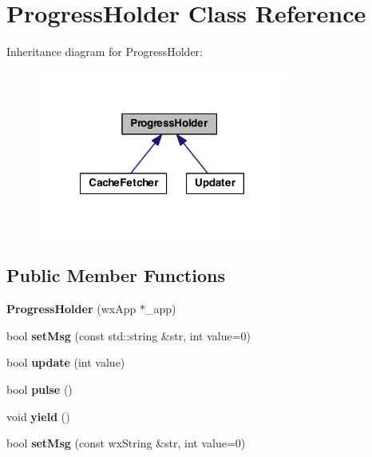 \hypertarget{class_progress_holder}{\section{Progress\-Holder Class Reference}
\label{class_progress_holder}
}


Inheritance diagram for Progress\-Holder\-:
\nopagebreak
\begin{figure}[H]
\begin{center}
\leavevmode
\includegraphics[width=233pt]{class_progress_holder__inherit__graph}
\end{center}
\end{figure}
\subsection*{Public Member Functions}
\begin{DoxyCompactItemize}
\item 
\hypertarget{class_progress_holder_ab768d833bea7d8b96f9875b95fc43cce}{{\bfseries Progress\-Holder} (wx\-App $\ast$\-\_\-app)}\label{class_progress_holder_ab768d833bea7d8b96f9875b95fc43cce}

\item 
\hypertarget{class_progress_holder_aa5d4a3606651c7c6b6d18d88b9d1a059}{bool {\bfseries set\-Msg} (const std\-::string \&str, int value=0)}\label{class_progress_holder_aa5d4a3606651c7c6b6d18d88b9d1a059}

\item 
\hypertarget{class_progress_holder_ad63d5b6b5623add47e065a773ba0b832}{bool {\bfseries update} (int value)}\label{class_progress_holder_ad63d5b6b5623add47e065a773ba0b832}

\item 
\hypertarget{class_progress_holder_a8d6e91204bedfe650ef3c03e4da264a1}{bool {\bfseries pulse} ()}\label{class_progress_holder_a8d6e91204bedfe650ef3c03e4da264a1}

\item 
\hypertarget{class_progress_holder_a8e5222f876b4ad904f12f0c4e14ab88c}{void {\bfseries yield} ()}\label{class_progress_holder_a8e5222f876b4ad904f12f0c4e14ab88c}

\item 
\hypertarget{class_progress_holder_a8c13297dc5ad35585dd476c25d415a27}{bool {\bfseries set\-Msg} (const wx\-String \&str, int value=0)}\label{class_progress_holder_a8c13297dc5ad35585dd476c25d415a27}

\end{DoxyCompactItemize}


